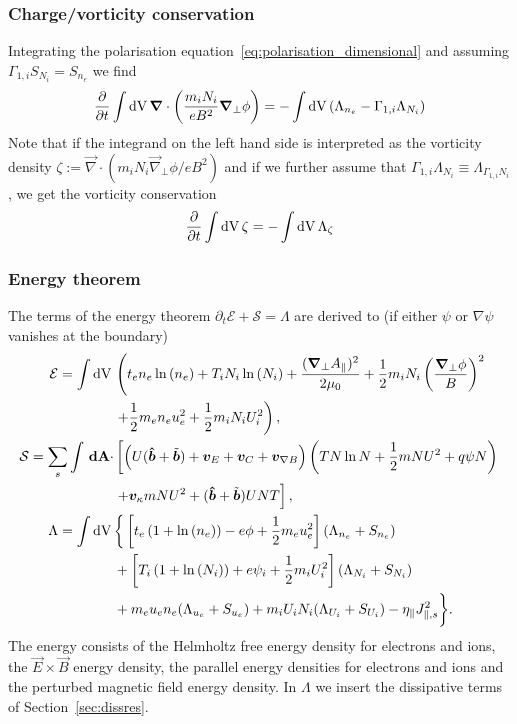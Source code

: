 \subsubsection{Charge/vorticity conservation}
Integrating the polarisation equation~\eqref{eq:polarisation_dimensional}
and assuming $\Gamma_{1,i}S_{N_i} = S_{n_e}$ we find
\begin{align} \label{eq:charge_conservation}
  \frac{\partial}{\partial t} \int \mathrm{dV}\, {\boldsymbol{\nabla}} \cdot\left(\frac{m_iN_i}{e B^2} {\boldsymbol{\nabla}}_\perp \phi\right) =  - \int \mathrm{dV}\, (\Lambda_{n_e} - \Gamma_{1,i}\Lambda_{N_i})
\end{align}
Note that if the integrand on the left hand side is interpreted as the \ExB vorticity
density
$\zeta := \vec \nabla\cdot( m_iN_i\vec \nabla_\perp\phi/e B^2)$
and if we further assume that $\Gamma_{1,i} \Lambda_{N_i} \equiv \Lambda_{\Gamma_{1,i}N_i}$,
we get the vorticity conservation
\begin{align} \label{eq:vorticity_conservation}
  \frac{\partial}{\partial t} \int \mathrm{dV}\, \zeta =  - \int \mathrm{dV}\,\Lambda_{\zeta}
\end{align}

\subsubsection{Energy theorem}
The terms of the energy theorem $\partial_t \mathcal E + \mathcal S =
\Lambda$ are derived to (if either $\psi$ or $\nabla\psi$ vanishes at the
boundary)
\begin{align} \label{eq:energy_conservation}
  \mathcal{E} = \int  \mathrm{dV}\, & \left( t_e n_e \ln{(n_e)} +T_i N_i\ln{(N_i)}+
    \frac{({\boldsymbol{\nabla}}_\perp A_\parallel)^2}{2\mu_0} 
    +\frac{1}{2} m_i N_i \left(\frac{{\boldsymbol{\nabla}}_\perp\phi}{B}\right)^2 \right.\nonumber\\
    &\left.+\frac{1}{2} m_e  n_e u_e^2 +\frac{1}{2} m_i  N_i U_i^2  \right),\\
  \mathcal S = \sum_s \int {\boldsymbol{\,\mathrm{dA}}} \cdot &\left[ \left(
  U(\bm{\hat{b}}+\tilde{{\boldsymbol{b}}}) + {\boldsymbol{v}}_E + {\boldsymbol{v}}_C + {\boldsymbol{v}}_{\nabla B} \right)
  \left(T N\ln N + \frac{1}{2}m NU^2 + q\psi N \right) \right. \nonumber\\
  & \left . + {\boldsymbol{v}}_\kappa m NU^2  + (\bm{\hat{b}} + \tilde{{\boldsymbol{b}}}) UNT\right], \\
  \Lambda =  \int \mathrm{dV}\, & \bigg\{  \left[t_e\left( 1+\ln{(n_e)}\right) -e \phi + \frac{1}{2} m_e u_e^2 \right](\Lambda_{n_e} + S_{n_e})
  \nonumber\\ &
+\left[T_i\left( 1+\ln{(N_i)}\right) +e \psi_i + \frac{1}{2} m_i U_i^2 \right](\Lambda_{N_i}+S_{N_i})
\nonumber \\ &
+ m_e u_e n_e (\Lambda_{u_e}+S_{u_e})+m_iU_i N_i (\Lambda_{U_i}+S_{U_i})- \eta_\parallel J_{\parallel,s}^2\bigg\}.
\end{align}
The energy consists of the Helmholtz free energy density for electrons and ions, the \(\vec{E} \times \vec{B}\) energy density, the parallel energy densities for electrons and ions and the perturbed magnetic field energy density.
In \(\Lambda\) we insert the dissipative terms of Section~\ref{sec:dissres}. \\
